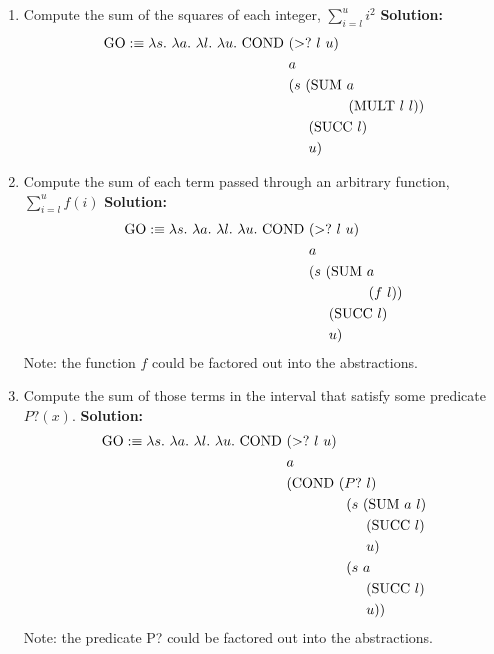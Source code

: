 \documentclass[11pt]{report}
\begin{document}
\begin{enumerate}
	 \begin{enumerate}
	 	\item Compute the sum of the squares of each integer, $\sum_{i=l}^u i^{2}$	 	
	 	\textbf{Solution:}	 		
	 		\begin{align*}
	 			\GO :\equiv \lambda s. \ \lambda a. \ \lambda l. \ \lambda u. \ \COND \ &(>? \ l \ u) \\
	 			&a \\
	 			&(s \ (\SUM \ a \\
	 			&\hspace{15mm}(\MULT \ l \ l)) \\
	 			&\hspace{5mm}(\SUCC \ l) \\
	 			&\hspace{5mm}u)	
	 		\end{align*}	 	
	 	\item Compute the sum of each term passed through an arbitrary function, $\sum_{i=l}^u f(i)$	 	
	 	\textbf{Solution:}	 		
	 		\begin{align*}
	 			\GO :\equiv \lambda s. \ \lambda a. \ \lambda l. \ \lambda u. \ \COND \ &(>? \ l \ u) \\
	 			&a \\
	 			&(s \ (\SUM \ a \\
	 			&\hspace{15mm}(f \ l)) \\
	 			&\hspace{5mm}(\SUCC \ l) \\
	 			&\hspace{5mm}u)	
	 		\end{align*}
	 		Note: the function $f$ could be factored out into the abstractions.
	 	\item Compute the sum of those terms in the interval that satisfy some predicate $P?(x)$.	 	
	 	\textbf{Solution:}	 		
	 		\begin{align*}
	 			\GO :\equiv \lambda s. \ \lambda a. \ \lambda l. \ \lambda u. \ \COND \ &(>? \ l \ u) \\
	 			&a \\
	 			&(\COND \ (P? \ l) \\
	 			&\hspace{15mm}(s \ (\SUM \ a \ l)\\
	 			&\hspace{20mm}(\SUCC \ l) \\
	 			&\hspace{20mm}u)\\
	 			&\hspace{15mm}(s \ a \\ 
	 			&\hspace{20mm}(\SUCC \ l) \\
	 			&\hspace{20mm}u))
	 		\end{align*}
	 		Note: the predicate P? could be factored out into the abstractions.
	 \end{enumerate}
	 

\end{enumerate}
\end{document}
